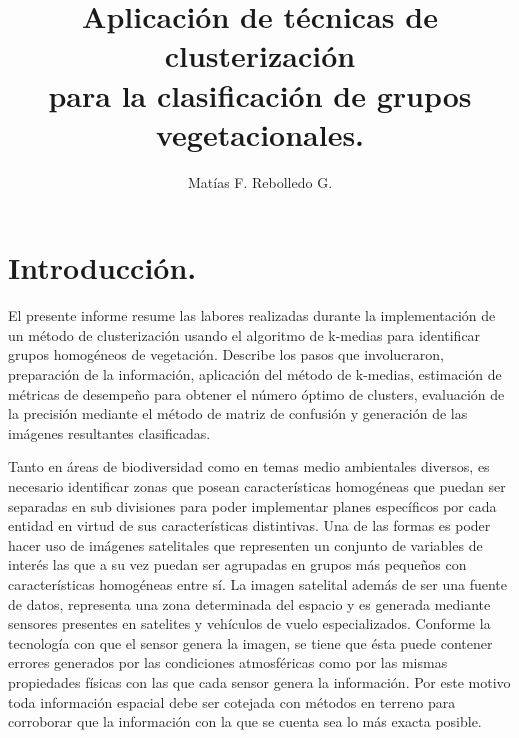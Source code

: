 \documentclass[]{article}
\title{Aplicación de técnicas de clusterización\\
para la clasificación de grupos vegetacionales.}
\author{Matías F. Rebolledo G.}
\date{}
\begin{document}
\maketitle


\newlength{\classpageheight}
\setlength{\classpageheight}{\paperheight}
\newlength{\classpagewidth}
\setlength{\classpagewidth}{\paperwidth}

\renewcommand{\contentsname}{Índice general}
\renewcommand{\listtablename}{Índice de cuadros}
\renewcommand{\listfigurename}{Índice de gráficos}
\renewcommand{\refname}{Referencias}
\renewcommand{\tablename}{Cuadro}
\renewcommand{\figurename}{Gráfico}

\clearpage
\tableofcontents
\listoftables
\listoffigures

\clearpage



\section{Introducción.}\label{introduccion.}

El presente informe resume las labores realizadas durante la
implementación de un método de clusterización usando el algoritmo de
k-medias para identificar grupos homogéneos de vegetación. Describe los
pasos que involucraron, preparación de la información, aplicación del
método de k-medias, estimación de métricas de desempeño para obtener el
número óptimo de clusters, evaluación de la precisión mediante el método
de matriz de confusión y generación de las imágenes resultantes
clasificadas.

Tanto en áreas de biodiversidad como en temas medio ambientales
diversos, es necesario identificar zonas que posean características
homogéneas que puedan ser separadas en sub divisiones para poder
implementar planes específicos por cada entidad en virtud de sus
características distintivas. Una de las formas es poder hacer uso de
imágenes satelitales que representen un conjunto de variables de interés
las que a su vez puedan ser agrupadas en grupos más pequeños con
características homogéneas entre sí. La imagen satelital además de ser
una fuente de datos, representa una zona determinada del espacio y es
generada mediante sensores presentes en satelites y vehículos de vuelo
especializados. Conforme la tecnología con que el sensor genera la
imagen, se tiene que ésta puede contener errores generados por las
condiciones atmosféricas como por las mismas propiedades físicas con las
que cada sensor genera la información. Por este motivo toda información
espacial debe ser cotejada con métodos en terreno para corroborar que la
información con la que se cuenta sea lo más exacta posible.
\end{document}
